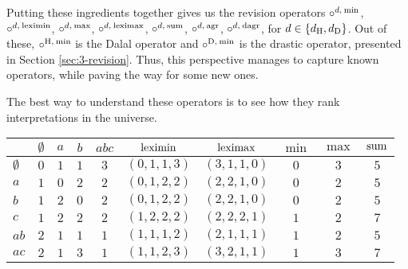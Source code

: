 Putting these ingredients together gives us the revision operators
$\circ^{d,\:{\operatorname{min}}}$,
$\circ^{d,\:{\operatorname{leximin}}}$,
$\circ^{d,\:{\operatorname{max}}}$,
$\circ^{d,\:{\operatorname{leximax}}}$,
$\circ^{d,\:{\operatorname{sum}}}$,
$\circ^{d,\:\mathrm{agr}}$,
$\circ^{d,\:\mathrm{dagr}}$,
for $d\in\{d_{\operatorname{H}},d_{\operatorname{D}}\}$.
Out of these, $\circ^{{\operatorname{H}},\:{\operatorname{min}}}$ is the Dalal operator
and $\circ^{{\operatorname{D}},\:{\operatorname{min}}}$ is the drastic operator,
presented in Section \ref{sec:3-revision}.
Thus, this perspective manages to capture 
known operators, while paving the way for some new ones.

The best way to understand these operators is to see how they rank interpretations in the universe.

\begin{table}\centering
\begin{tabular}{lccccccccc}
	\toprule
										&
	$\emptyset$ 						&
	$a$ 								& 
	$b$ 								& 
	$abc$								& 
	${\operatorname{leximin}}$ 							& 
	${\operatorname{leximax}}$ 							&
	$\min$								&
	$\max$								& 
	${\operatorname{sum}}$								\\\midrule

	$\emptyset$ 						& 
	$0$									&
	$1$									& 
	$1$									& 
	$3$									& 
	$(0,1,1,3)$							&
	$(3,1,1,0)$							&
	$0$									&	
	$3$									& 
	$5$									\\
	
	$a$									& 
	$1$									& 
	$0$									& 
	$2$									& 
	$2$									& 
	$(0,1,2,2)$							&
	$(2,2,1,0)$							&
	$0$									&
	$2$									& 
	$5$									\\

	$b$									& 
	$1$									& 
	$2$									& 
	$0$									& 
	$2$									& 
	$(0,1,2,2)$							&
	$(2,2,1,0)$							&
	$0$									&
	$2$									& 
	$5$									\\

	$c$									& 
	$1$									& 
	$2$									& 
	$2$									& 
	$2$									& 
	$(1,2,2,2)$							&
	$(2,2,2,1)$							&
	$1$									&
	$2$									& 
	$7$									\\

	$ab$								& 
	$2$									&
	$1$									& 
	$1$									& 
	$1$									& 
	$(1,1,1,2)$							&
	$(2,1,1,1)$							&
	$1$									&
	$2$									& 
	$5$									\\
	
	$ac$								& 
	$2$									&
	$1$									& 
	$3$									& 
	$1$									& 
	$(1,1,2,3)$							&
	$(3,2,1,1)$							&
	$1$									&
	$3$									&
	$7$									\\
	

\end{tabular}
\end{table}
